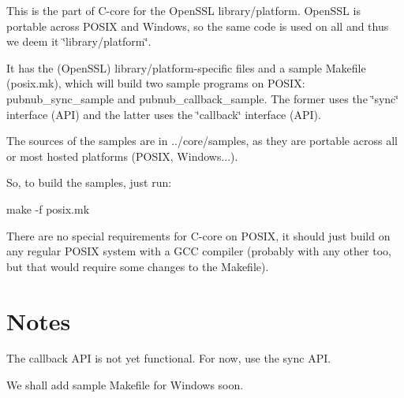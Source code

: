 This is the part of C-\/core for the Open\-S\-S\-L library/platform. Open\-S\-S\-L is portable across P\-O\-S\-I\-X and Windows, so the same code is used on all and thus we deem it \char`\"{}library/platform\char`\"{}.

It has the (Open\-S\-S\-L) library/platform-\/specific files and a sample Makefile ({\ttfamily posix.\-mk}), which will build two sample programs on P\-O\-S\-I\-X\-: {\ttfamily pubnub\-\_\-sync\-\_\-sample} and {\ttfamily pubnub\-\_\-callback\-\_\-sample}. The former uses the \char`\"{}sync\char`\"{} interface (A\-P\-I) and the latter uses the \char`\"{}callback\char`\"{} interface (A\-P\-I).

The sources of the samples are in {\ttfamily ../core/samples}, as they are portable across all or most hosted platforms (P\-O\-S\-I\-X, Windows...).

So, to build the samples, just run\-: \begin{DoxyVerb}make -f posix.mk
\end{DoxyVerb}


There are no special requirements for C-\/core on P\-O\-S\-I\-X, it should just build on any regular P\-O\-S\-I\-X system with a G\-C\-C compiler (probably with any other too, but that would require some changes to the Makefile).

\section*{Notes}


\begin{DoxyItemize}
\item The callback A\-P\-I is not yet functional. For now, use the sync A\-P\-I.
\item We shall add sample Makefile for Windows soon. 
\end{DoxyItemize}
